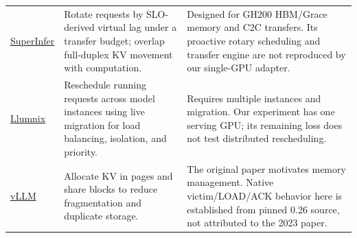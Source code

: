 \begin{longtable}{>{\raggedright\arraybackslash}p{}>{\raggedright\arraybackslash}p{}>{\raggedright\arraybackslash}p{}}
\href{https://arxiv.org/html/2601.20309v1}{SuperInfer} & Rotate requests by SLO-derived virtual lag under a transfer budget; overlap full-duplex KV movement with computation. & Designed for GH200 HBM/Grace memory and C2C transfers. Its proactive rotary scheduling and transfer engine are not reproduced by our single-GPU adapter. \\
\href{https://www.usenix.org/conference/osdi24/presentation/sun-biao}{Llumnix} & Reschedule running requests across model instances using live migration for load balancing, isolation, and priority. & Requires multiple instances and migration. Our experiment has one serving GPU; its remaining loss does not test distributed rescheduling. \\
\href{https://arxiv.org/abs/2309.06180}{vLLM} & Allocate KV in pages and share blocks to reduce fragmentation and duplicate storage. & The original paper motivates memory management. Native victim/LOAD/ACK behavior here is established from pinned 0.26 source, not attributed to the 2023 paper. \\
\bottomrule\end{longtable}
\endgroup
